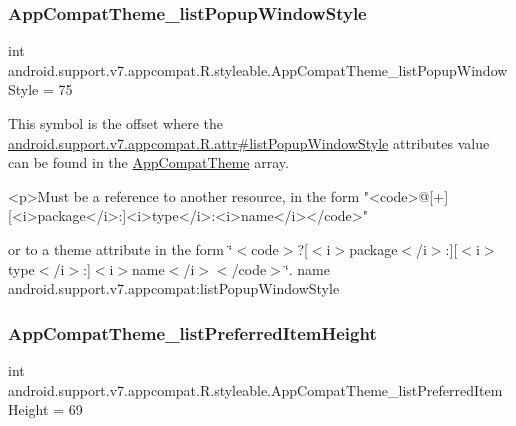 \subsubsection{\texorpdfstring{App\+Compat\+Theme\+\_\+list\+Popup\+Window\+Style}{AppCompatTheme\_listPopupWindowStyle}}
{\footnotesize\ttfamily int android.\+support.\+v7.\+appcompat.\+R.\+styleable.\+App\+Compat\+Theme\+\_\+list\+Popup\+Window\+Style = 75\hspace{0.3cm}{\ttfamily [static]}}

This symbol is the offset where the \hyperlink{classandroid_1_1support_1_1v7_1_1appcompat_1_1R_1_1attr_a6c3e8088ac6dfdc51c06245cf9673ed4}{android.\+support.\+v7.\+appcompat.\+R.\+attr\#list\+Popup\+Window\+Style} attribute\textquotesingle{}s value can be found in the \hyperlink{classandroid_1_1support_1_1v7_1_1appcompat_1_1R_1_1styleable_a5c42f89e8a410c323be34208d75c430b}{App\+Compat\+Theme} array.

\begin{DoxyVerb}      <p>Must be a reference to another resource, in the form "<code>@[+][<i>package</i>:]<i>type</i>:<i>name</i></code>"
\end{DoxyVerb}
 or to a theme attribute in the form \char`\"{}$<$code$>$?\mbox{[}$<$i$>$package$<$/i$>$\+:\mbox{]}\mbox{[}$<$i$>$type$<$/i$>$\+:\mbox{]}$<$i$>$name$<$/i$>$$<$/code$>$\char`\"{}.  name android.\+support.\+v7.\+appcompat\+:list\+Popup\+Window\+Style \mbox{\label{classandroid_1_1support_1_1v7_1_1appcompat_1_1R_1_1styleable_a491ac1bac5d3e90d2488434571ab909e}} 
\subsubsection{\texorpdfstring{App\+Compat\+Theme\+\_\+list\+Preferred\+Item\+Height}{AppCompatTheme\_listPreferredItemHeight}}
{\footnotesize\ttfamily int android.\+support.\+v7.\+appcompat.\+R.\+styleable.\+App\+Compat\+Theme\+\_\+list\+Preferred\+Item\+Height = 69\hspace{0.3cm}{\ttfamily [static]}}

